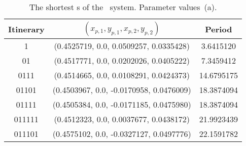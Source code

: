 \begin{table}
	\begin{tabular}{c|c|c}
	Itinerary & $(x_{p,1}, y_{p,1}, x_{p,2}, y_{p,2})$ & Period \\
	\hline
	1 & (0.4525719,   0.0, 0.0509257, 0.0335428) & 3.6415120 \\
 	\hline
	01 & (0.4517771,   0.0, 0.0202026, 0.0405222) & 7.3459412 \\
 	\hline
	0111 & (0.4514665,   0.0, 0.0108291, 0.0424373) & 14.6795175 \\
 	\hline
	01101 & (0.4503967,   0.0, -0.0170958, 0.0476009) & 18.3874094 \\
 	\hline
	01111 & (0.4505384,   0.0, -0.0171185, 0.0475980) & 18.3874094 \\
 	\hline
	011111 & (0.4512323,   0.0, 0.0037677, 0.0438172) & 21.9923439 \\
 	\hline
	011101 & (0.4575102,   0.0, -0.0327127, 0.0497776) & 22.1591782 \\
 	\end{tabular}
	\caption{
The shortest \rpo s of the \twomode\ system.
Parameter values \,(a).
    }
	\label{tab:twomoderpos}
\end{table}
